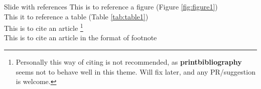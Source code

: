 \documentclass{beamer}
\begin{document}
    \begin{frame}{Slide with references}
        This is to reference a figure (Figure \ref{fig:figure1})\\
        This it to reference a table (Table \ref{tab:table1})\\
        This is to cite an article \cite{vaswani2017attention}\footnote{Personally this way of citing is not recommended, as \textbf{printbibliography} seems not to behave well in this theme. Will fix later, and any PR/suggestion is welcome. }\\
        This is to cite an article in the format of footnote 
    \end{frame}


    \printbibliography[title={References},heading=bibnumbered]
\end{document}
